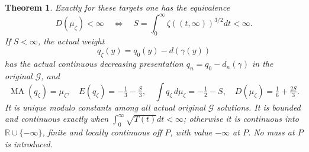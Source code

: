 \documentclass[11pt]{article}
\newtheorem{theorem}{Theorem}
\newcommand{\MA}{\operatorname{MA}}
\begin{document}
\begin{theorem}\label{branch:radon}
Exactly for these targets one has the equivalence
\[
 D(\mu_\zeta)<\infty\quad\Longleftrightarrow\quad
 S=\int_0^\infty\zeta((t,\infty))^{3/2}dt<\infty.
\]
If $S<\infty$, the actual weight
\[
 q_\zeta(y)=q_0(y)-d(\gamma(y))
\]
has the actual continuous decreasing presentation
$q_n=q_0-d_n(\gamma)$ in the original $\mathcal G$, and
\[
 \MA(q_\zeta)=\mu_\zeta,\quad E(q_\zeta)=-\tfrac13-\tfrac S3,
 \quad\int q_\zeta\,d\mu_\zeta=-\tfrac12-S,
 \quad D(\mu_\zeta)=\tfrac16+\tfrac{2S}3.
\]
It is unique modulo constants among all actual original $\mathcal G$
solutions. It is bounded and continuous exactly when
$\int_0^\infty\sqrt{T(t)}dt<\infty$; otherwise it is continuous into
$\mathbb R\cup\{-\infty\}$, finite and locally continuous off $P$,
with value $-\infty$ at $P$. No mass at $P$ is introduced.
\end{theorem}
\end{document}
